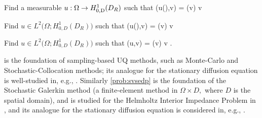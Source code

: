\label{prob:msedp}
Find a measurable $u:\Omega\rightarrow\HozDDR$ such that
\vspace{-2ex}
\beqs
{}\mleft(u(\omega),v\mright) = (v) \tforall v \in \HozDDR {}
\eeqs
\eprob

\label{prob:somsedp}
Find $u\in L^2\big(\Omega;H_{0,D}^1(D_R)\big)$ such that
\beqs
{}\mleft(u(\omega),v\mright) = (v) \tforall v \in \HozDDR {}
\eeqs
\eprob

\label{prob:svsedp}
Find $u\in L^2\big(\Omega;H_{0,D}^1(D_R)\big)$ such that
\beqs
\as(u,v) = \Ls(v) \tforall v \in \LtOHozDDR.
\eeqs
\eprob


 is the foundation of sampling-based UQ methods, such as Monte-Carlo and Stochastic-Collocation methods; its analogue for the stationary diffusion equation is well-studied in, e.g., \cite{XiHe:05,BaNoTe:07,NoTeWe:08a,Ch:12,ChScTe:13,TeJaWeGu:15,KuNu:16,HeLaSc:18}. Similarly \cref{prob:svsedp} is the foundation of the Stochastic Galerkin method (a finite-element method in $\Omega \times D,$ where $D$ is the spatial domain), and is studied for the Helmholtz Interior Impedance Problem in \cite{FeLiLo:15}, and its analogue for the stationary diffusion equation is considered in, e.g., \cite{BaTeZo:04,KhSc:11,BaScZo:11,GuWeZh:14}.

